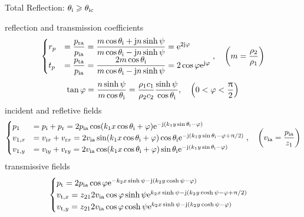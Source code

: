 \documentclass[9pt,mathserif]{beamer}
\begin{document}
\begin{frame}{Total Reflection: $\theta_\text{i} \geqslant \theta_\text{ic}$}
	\begin{outline}
		\1 reflection and transmission coefficients 
		$$
			\begin{cases}
				r_p & = \dfrac{p\st{ra}}{p\st{ia}} = \dfrac{m\cos \theta \st{i} +
			\mj n \sinh \psi }{m\cos \theta\st{i} - \mj n \sinh \psi} = 
			\me^{2\mj \phi}\\
			t_p&=\dfrac{p\st{ta}}{p\st{ia}} = \dfrac{2m\cos \theta \st{i}}{m\cos 
				\theta\st{i} - \mj n \sinh \psi} = 2\cos\phi \me^{\mj \phi}
			\end{cases}
			\qc \qty(m = \frac{\rho_2}{\rho_1})		
		$$
		$$
		\tan \phi = \frac{n\sinh \psi}{m \cos \theta\st{i}} = 
		\frac{\rho_1c_1}{\rho_2c_2} \frac{\sinh \psi}{\cos \theta\st{i}}
		\qc \qty(0<\phi<\frac{\uppi}{2})$$
		\1 incident and refletive fields
		$$
	\begin{cases}
		p_1&= p\st{i}+p\st{r} = 2p\st{ia}\cos(k_1x\cos\theta\st{i}+\phi)
		\me^{-\mj (k_1y\sin\theta\st{i}-\phi)}\\
		v_{1,x}&= v_{\mi x} + v_{\mathrm{r}x} = 2v\st{ia}\sin
		(k_1x\cos\theta\st{i}+\phi)\cos\theta\st{i}
		\me^{-\mj \qty(k_1y\sin\theta\st{i}-\phi+ \uppi/2)}\\
		v_{1,y}&= v_{\mi y} + v_{\mathrm{r}y} = 2v\st{ia}\cos
		(k_1x\cos\theta\st{i}+\phi)\sin\theta\st{i}
		\me^{-\mj \qty(k_1y\sin\theta\st{i}-\phi)}
	\end{cases}
	\qc \qty(v\st{ia} = \frac{p\st{ia}}{z_1})
$$
	\1 transmissive fields
$$
	\begin{cases}
		p_\text{t} = 2p_\text{ia} \cos \varphi \mathrm{e}^{-k_2x\sinh \psi - \mathrm{j} (k_2 y
		\cosh \psi -\varphi)}\\
		v_{\mathrm{t,}x} = z_{21} 2v_\text{ia} \cos\varphi
		\sinh \psi \mathrm{e}^{k_2x\sinh \psi - \mathrm{j}\qty(k_2y\cosh \psi -\varphi
		+\uppi/2)}\\
		v_{\mathrm{t,}y} = z_{21} 2v_\text{ia} \cos\varphi
		\cosh \psi \mathrm{e}^{k_2x\sinh \psi - \mathrm{j}\qty(k_2y\cosh \psi -\varphi
		)}
	\end{cases}
	$$
	\end{outline}
\end{frame}
\end{document}
